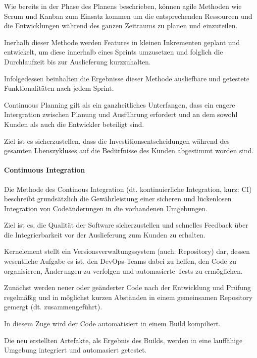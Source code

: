 Wie bereits in der Phase des Planens beschrieben, können agile Methoden wie Scrum und Kanban zum Einsatz kommen um die entsprechenden Ressourcen und die Entwicklungen während des ganzen Zeitraums zu planen und einzuteilen.

Inerhalb dieser Methode werden Features in kleinen Inkrementen geplant und entwickelt, um diese innerhalb eines Sprints umzusetzen und folglich die Durchlaufzeit bis zur Auslieferung kurzzuhalten. \cite[S. 266]{tokarski_strategische_2018} 

Infolgedessen beinhalten die Ergebnisse dieser Methode ausliefbare und getestete Funktionalitäten nach jedem Sprint. 

Continuous Planning gilt als ein ganzheitliches Unterfangen, dass ein engere Intergration zwischen Planung und Ausführung erfordert und an dem sowohl Kunden als auch die Entwickler beteiligt sind. \cite{fitzgerald_continuous_2014} 

Ziel ist es sicherzustellen, dass die Investitionsentscheidungen während des gesamten Lbenszykluses auf die Bedürfnisse des Kunden abgestimmt worden sind. 

\paragraph{Continuous Integration}

Die Methode des Continous Integration (dt. kontinuierliche Integration, kurz: CI) beschreibt grundsätzlich die Gewährleistung einer sicheren und lückenlosen Integration von Codeänderungen in die vorhandenen Umgebungen. \cite[S. 266]{tokarski_strategische_2018}  

Ziel ist es, die Qualität der Software sicherzustellen und schnelles Feedback über die Integrierbarkeit vor der Auslieferung zum Kunden zu erhalten. \cite[S. 266]{tokarski_strategische_2018} 

Kernelement stellt ein Versionsverwaltungssystem (auch: Repository) dar, dessen wesentliche Aufgabe es ist, den DevOps-Teams dabei zu helfen, den Code zu organisieren, Änderungen zu verfolgen und automasierte Tests zu ermöglichen. 

Zunächst werden neuer oder geänderter Code nach der Entwicklung und Prüfung regelmäßig und in möglichst kurzen Abständen in einem gemeinsamen Repository gemergt (dt. zusammengeführt). \cite[S. 13-16]{sharma_devops_2017}

In diesem Zuge wird der Code automatisiert in einem Build kompiliert. 

Die neu erstellten Artefakte, als Ergebnis des Builds, werden in eine lauffähige Umgebung integriert und automasiert getestet. 

